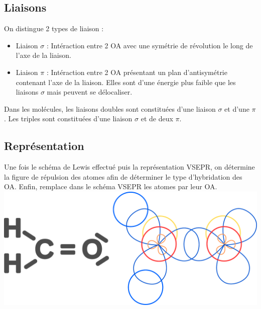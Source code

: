 \documentclass[french]{yLectureNote}
\begin{document}
\subsection{Liaisons}
On distingue 2 types de liaison :
\begin{itemize}
 \item Liaison $\sigma$ : Intéraction entre 2 OA avec une symétrie de révolution le long de l'axe de la liaison.
 \item Liaison $\pi$ : Intéraction entre 2 OA présentant un plan d'antisymétrie contenant l'axe de la liaison. Elles sont d'une énergie plus faible que les liaisons $\sigma$ mais peuvent se délocaliser.
\end{itemize}
Dans les molécules, les liaisons doubles sont constituées d'une liaison $\sigma$ et d'une $\pi$. Les triples  sont constituées d'une liaison $\sigma$ et de deux $\pi$.

\subsection{Représentation}
Une fois le schéma de Lewis effectué puis la représentation VSEPR, on détermine la figure de répulsion des atomes afin de déterminer le type d'hybridation des OA. Enfin, remplace dans le schéma VSEPR les atomes par leur OA.
\includegraphics[scale=0.3]{representation_OA}
\end{document}

